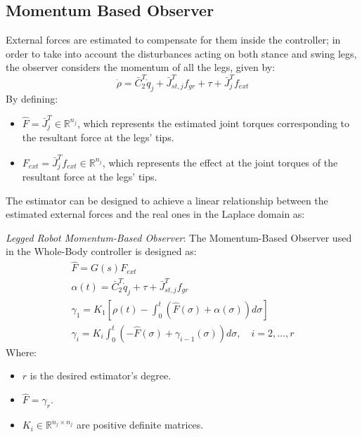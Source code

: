 \subsection{Momentum Based Observer}
External forces are estimated to compensate for them inside the controller; in order to take into account the disturbances acting on both stance and swing legs, the observer considers the momentum of all the legs, given by:
\begin{equation}
    \dot{\rho}=\bar{C}_{2}^{T}\dot{q}_{j}+\bar{J}_{st,j}^{T}f_{gr}+\tau+\bar{J}_{j}^{T}f_{ext}
\end{equation}
By defining:
\begin{itemize}
    \item $\hat{F}=\bar{J}_{j}^{T}\in\mathbb{R}^{n_j}$, which represents the estimated joint torques corresponding to the resultant force at the legs' tips.
    \item $F_{ext}=\bar{J}_{j}^{T}f_{ext}\in\mathbb{R}^{n_j}$, which represents the effect at the joint torques of the resultant force at the legs' tips.
\end{itemize}
The estimator can be designed to achieve a linear relationship between the estimated external forces and the real ones in the Laplace domain as:
\begin{definition}\label{legged_estimator}
    \textit{Legged Robot Momentum-Based Observer}: The Momentum-Based Observer used in the Whole-Body controller is designed as:
    \begin{gather}\label{legged_estimator_eq}
        \hat{F}=G(s)F_{ext}\\
        \alpha(t)=\bar{C}_{2}^{T}\dot{q}_{j}+\tau+\bar{J}_{st,j}^{T}f_{gr}\\
        \gamma_1=K_1\left[\rho(t)-\int_{0}^{t}\left(\hat{F}(\sigma)+\alpha(\sigma)\right)d\sigma\right]\\
        \gamma_i=K_i\int_{0}^{t}{\left(-\hat{F}(\sigma)+\gamma_{i-1}(\sigma)\right)d\sigma}, \quad i=2,\dots,r
    \end{gather}
    Where:
    \begin{itemize}
        \item $r$ is the desired estimator's degree.
        \item $\hat{F}=\gamma_r$.
        \item $K_i\in\mathbb{R}^{n_j\times n_j}$ are positive definite matrices.
    \end{itemize}
\end{definition}
